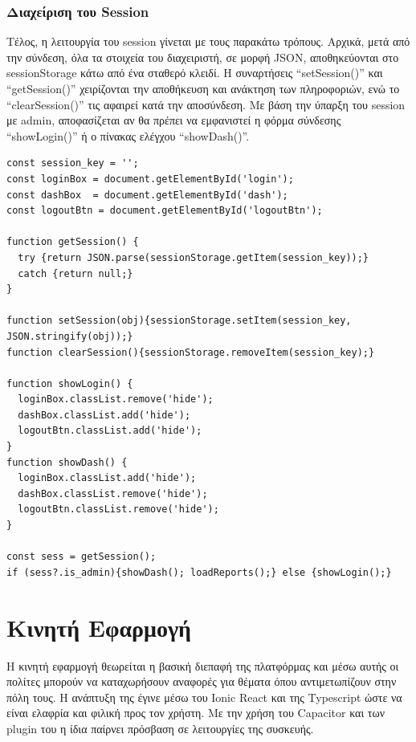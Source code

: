\subsubsection*{Διαχείριση του Session}
Τέλος, η λειτουργία του session γίνεται με τους παρακάτω τρόπους. Αρχικά, μετά από την σύνδεση, όλα τα στοιχεία του διαχειριστή, σε μορφή JSON, αποθηκεύονται στο sessionStorage κάτω από ένα σταθερό κλειδί. Η συναρτήσεις “setSession()” και “getSession()” χειρίζονται την αποθήκευση και ανάκτηση των πληροφοριών, ενώ το “clearSession()” τις αφαιρεί κατά την αποσύνδεση. Με βάση την ύπαρξη του session με admin, αποφασίζεται αν θα πρέπει να εμφανιστεί η φόρμα σύνδεσης “showLogin()” ή ο πίνακας ελέγχου “showDash()”.
\\
\begin{lstlisting}
const session_key = '';
const loginBox = document.getElementById('login');
const dashBox  = document.getElementById('dash');
const logoutBtn = document.getElementById('logoutBtn');

function getSession() {
  try {return JSON.parse(sessionStorage.getItem(session_key));} 
  catch {return null;}
}

function setSession(obj){sessionStorage.setItem(session_key, JSON.stringify(obj));}
function clearSession(){sessionStorage.removeItem(session_key);}

function showLogin() {
  loginBox.classList.remove('hide');
  dashBox.classList.add('hide');
  logoutBtn.classList.add('hide');
}
function showDash() {
  loginBox.classList.add('hide');
  dashBox.classList.remove('hide');
  logoutBtn.classList.remove('hide');
}

const sess = getSession();
if (sess?.is_admin){showDash(); loadReports();} else {showLogin();}
\end{lstlisting}

\section{Κινητή Εφαρμογή}
Η κινητή εφαρμογή θεωρείται η βασική διεπαφή της πλατφόρμας και μέσω αυτής οι πολίτες μπορούν να καταχωρήσουν αναφορές για θέματα όπου αντιμετωπίζουν στην πόλη τους. Η ανάπτυξη της έγινε μέσω του Ionic React και της Typescript ώστε να είναι ελαφρία και φιλική προς τον χρήστη. Με την χρήση του Capacitor και των plugin του η ίδια παίρνει πρόσβαση σε λειτουργίες της συσκευής.

